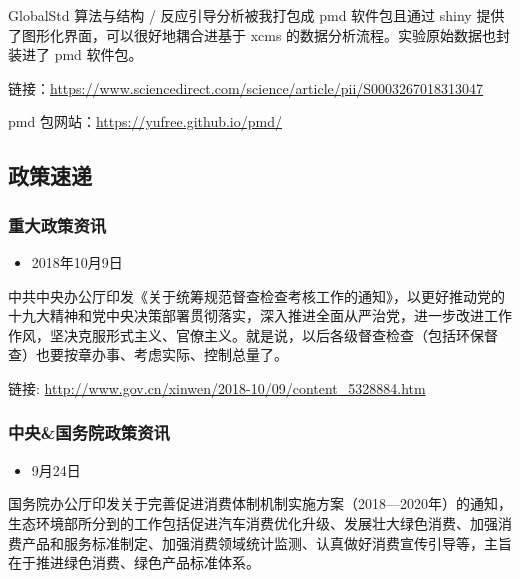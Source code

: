 \documentclass[]{book}
\providecommand{\tightlist}{%
  \setlength{\itemsep}{0pt}\setlength{\parskip}{0pt}}
\begin{document}
GlobalStd 算法与结构 / 反应引导分析被我打包成 pmd 软件包且通过 shiny 提供了图形化界面，可以很好地耦合进基于 xcms 的数据分析流程。实验原始数据也封装进了 pmd 软件包。

链接：\url{https://www.sciencedirect.com/science/article/pii/S0003267018313047}

pmd 包网站：\url{https://yufree.github.io/pmd/}

\hypertarget{ux653fux7b56ux901fux9012-6}{%
\subsection*{政策速递}\label{ux653fux7b56ux901fux9012-6}}

\hypertarget{ux91cdux5927ux653fux7b56ux8d44ux8baf-6}{%
\subsubsection*{重大政策资讯}\label{ux91cdux5927ux653fux7b56ux8d44ux8baf-6}}

\begin{itemize}
\tightlist
\item
  2018年10月9日
\end{itemize}

中共中央办公厅印发《关于统筹规范督查检查考核工作的通知》，以更好推动党的十九大精神和党中央决策部署贯彻落实，深入推进全面从严治党，进一步改进工作作风，坚决克服形式主义、官僚主义。就是说，以后各级督查检查（包括环保督查）也要按章办事、考虑实际、控制总量了。

链接: \url{http://www.gov.cn/xinwen/2018-10/09/content_5328884.htm}

\hypertarget{ux4e2dux592eux56fdux52a1ux9662ux653fux7b56ux8d44ux8baf-6}{%
\subsubsection*{中央\&国务院政策资讯}\label{ux4e2dux592eux56fdux52a1ux9662ux653fux7b56ux8d44ux8baf-6}}

\begin{itemize}
\tightlist
\item
  9月24日
\end{itemize}

国务院办公厅印发关于完善促进消费体制机制实施方案（2018---2020年）的通知，生态环境部所分到的工作包括促进汽车消费优化升级、发展壮大绿色消费、加强消费产品和服务标准制定、加强消费领域统计监测、认真做好消费宣传引导等，主旨在于推进绿色消费、绿色产品标准体系。
\end{document}

